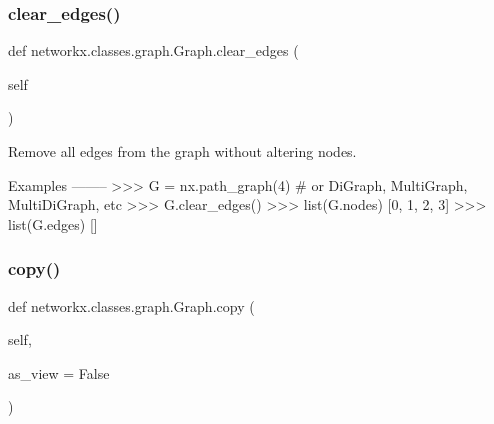 \subsubsection{\texorpdfstring{clear\+\_\+edges()}{clear\_edges()}}
{\footnotesize\ttfamily def networkx.\+classes.\+graph.\+Graph.\+clear\+\_\+edges (\begin{DoxyParamCaption}\item[{}]{self }\end{DoxyParamCaption})}

\begin{DoxyVerb}Remove all edges from the graph without altering nodes.

Examples
--------
>>> G = nx.path_graph(4)  # or DiGraph, MultiGraph, MultiDiGraph, etc
>>> G.clear_edges()
>>> list(G.nodes)
[0, 1, 2, 3]
>>> list(G.edges)
[]
\end{DoxyVerb}
 \mbox{\label{classnetworkx_1_1classes_1_1graph_1_1Graph_af5b1281d6428d14a74984c699e748eb9}} 
\subsubsection{\texorpdfstring{copy()}{copy()}}
{\footnotesize\ttfamily def networkx.\+classes.\+graph.\+Graph.\+copy (\begin{DoxyParamCaption}\item[{}]{self,  }\item[{}]{as\+\_\+view = {\ttfamily False} }\end{DoxyParamCaption})}

